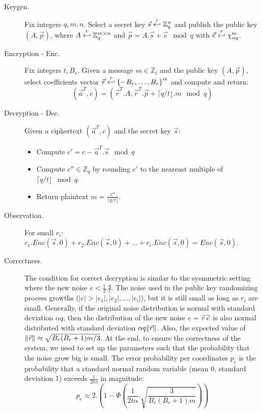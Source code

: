 \begin{description}
\item [Keygen.] Fix integers $q, m, n$. Select a secret key
  $\vec{s} \stackrel{r}{\hookleftarrow} \mathbb{Z}_q^n$ and publish the public key
  $(A,\vec{p})$, where $A \stackrel{r}{\hookleftarrow} \mathbb{Z}_q^{m \times n}$ and
  $\vec{p} = A.\vec{s} + \vec{e} \mod q$ with
  $\vec{e} \stackrel{r}{\hookleftarrow} \chi_{\alpha q}^m$.
\item [Encryption - Enc.] Fix integers $t, B_r$. Given a message
  $m \in \mathbb{Z}_t$ and the public key $(A,\vec{p})$, select coefficients
  vector $\vec{r} \stackrel{r}{\hookleftarrow} \left\{ -B_r, \dots, B_r \right\}^m$ and compute
  and return:
  \[
    (\vec{a}^T, c) = ( \vec{r}^T . A, \vec{r}^T .  \vec{p} + \lceil q/t \rfloor
    . m \mod q)
  \]
\item [Decryption - Dec.] Given a ciphertext $(\vec{a}^T, c)$ and the secret key
  $\vec{s}$:
  \begin{itemize}
  \item Compute $c' = c - \vec{a}^T . \vec{s} \mod q$
  \item Compute $c'' \in \mathbb{Z}_q$ by rounding $c'$ to the neareast multiple
    of $\lceil q/t \rfloor \mod q$.
  \item Return plaintext $m = \frac{c''}{\lceil q/t \rfloor}$.
  \end{itemize}
\item [Observation.] For small $r_i$:
  $r_1.Enc(\vec{s},0) + r_2.Enc(\vec{s}, 0) + \dots + r_i.Enc(\vec{s},0) =
  Enc(\vec{s}, 0)$.
\item [Correctness.] The condition for correct decryption is similar to the
  sysmmetric setting where the new noise $e < \frac{1}{2}. \frac{q}{t}$. The
  noise used in the public key randomizing process growths
  ($|e| > |e_1|, |e_2|,\dots,|e_i|$), but it is still small as long as $r_i$ are
  small. Generally, if the original noise distribution is normal with standard
  deviation $\alpha q$, then the distribution of the new noise
  $e = \vec{r}\vec{e}$ is also normal distributed with standard deviation
  $\alpha q \Vert \vec{r} \Vert$. Also, the expected value of
  $\Vert \vec{r} \Vert \approx \sqrt{B_r(B_r + 1)m/3}$. At the end, to ensure the
  correctness of the system, we need to set up the parameters such that the
  probability that the noise grow big is small. The error probability per
  coordinates $p_e$ is the probability that a standard normal random variable
  (mean 0, standard deviation 1) exceeds $\frac{1}{2t\alpha}$ in magnitude:
  \[
    p_e \approx 2 . \left( 1 - \Phi\left(
        \frac{1}{2t\alpha}.\sqrt{\frac{3}{B_r(B_r+1)m}} \right) \right)
\]
\end{description}
